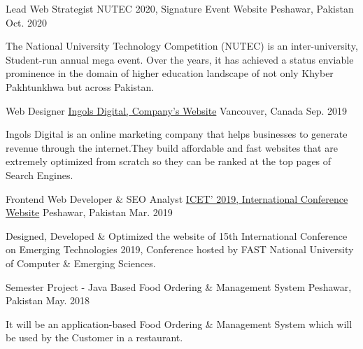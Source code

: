 \begin{cventries}

\cventry
{Lead Web Strategist} %
{NUTEC 2020, Signature Event Website} %
{Peshawar, Pakistan} %
{Oct. 2020} %
{ %
\begin{cvitems}
\item {The National University Technology Competition (NUTEC) is an inter-university, Student-run annual mega event. Over the years, it has achieved a status enviable prominence in the domain of higher education landscape of not only Khyber Pakhtunkhwa but across Pakistan.
}
\end{cvitems}
}



\cventry
{Web Designer} %
{\href{https://www.ingolsdigital.com/}{Ingols Digital, Company's Website}} %
{Vancouver, Canada} %
{Sep. 2019} %
{ %
\begin{cvitems}
\item {Ingols Digital is an online marketing company that helps businesses to generate revenue through the internet.They build affordable and fast websites that are extremely optimized from scratch so they can be ranked at the top pages of Search Engines.}
\end{cvitems}
}







\cventry
{Frontend Web Developer \& SEO Analyst  } %
{\href{http://icet.org.pk/2019}{ICET' 2019, International Conference Website}} %
{Peshawar, Pakistan} %
{Mar. 2019} %
{ %
\begin{cvitems}
\item {Designed, Developed \& Optimized the website of 15th International Conference on Emerging Technologies 2019, Conference hosted by FAST National University of Computer \& Emerging Sciences.
}
\end{cvitems}
}


\cventry
{Semester Project - Java Based} %
{Food Ordering \& Management System} %
{Peshawar, Pakistan} %
{May. 2018} %
{ %
\begin{cvitems}
\item {It will be an application-based Food Ordering \& Management System which will be used by the Customer in a restaurant.
}
\end{cvitems}
}


\end{cventries}
